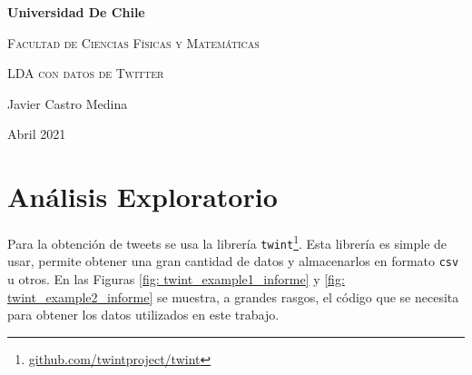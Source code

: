 \documentclass{article}
\begin{document}


\begin{titlepage}
	\centering
	{\bfseries\LARGE Universidad De Chile \par}
	\vspace{1cm}
	{\scshape\Large Facultad de Ciencias Físicas y Matemáticas \par}
	\vspace{3cm}
	{\scshape\Huge LDA con datos de Twitter \par}
	\vfill
	{\Large  Javier Castro Medina\par}

	\vfill
	{\Large Abril 2021 \par}
\end{titlepage}
\newpage

\section{Análisis Exploratorio}
Para la obtención de tweets se usa la librería \texttt{twint}\footnote{\href{https://github.com/twintproject/twint}{github.com/twintproject/twint}}. Esta librería es simple de usar, permite obtener una gran cantidad de datos y almacenarlos en formato \texttt{csv} u otros. En las Figuras \ref{fig: twint_example1_informe} y \ref{fig: twint_example2_informe} se muestra, a grandes rasgos, el código que se necesita para obtener los datos utilizados en este trabajo.    
\end{document}
